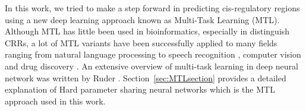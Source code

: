 In this work, we tried to make a step forward in predicting cis-regulatory
regions using a new deep learning approach known as Multi-Task Learning
(MTL). Although MTL has little been used in bioinformatics,
especially in distinguish CRRs, a lot of MTL variants have been successfully applied to many
fields ranging from natural language processing \cite{CollobertWeston2008} to speech recognition \cite{Deng2013}, computer vision \cite{Girshick2015} and drug discovery \cite{Ramsundar2015}. An extensive overview of multi-task learning in deep neural network was written by Ruder \cite{Ruder2017}. Section~\ref{sec:MTLsection} provides a detailed explanation of Hard parameter sharing neural networks which is the MTL approach used in this work.